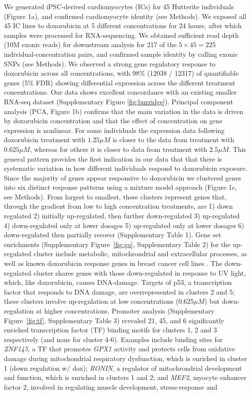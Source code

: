 \documentclass{article}
\begin{document}
We generated iPSC-derived cardiomyocytes (ICs) for 45 Hutterite individuals (Figure 1a), and confirmed cardiomyocyte identity (see Methods). We exposed all 45 IC lines to doxorubicin at 5 different concentrations for 24 hours, after which samples were processed for RNA-sequencing. We obtained sufficient read depth (10M exonic reads) for downstream analysis for 217 of the $5 \times 45 = 225$ individual-concentration pairs, and confirmed sample identity by calling exonic SNPs (see Methods). We observed a strong gene regulatory response to doxorubicin across all concentrations, with 98\% (12038 / 12317) of quantifiable genes (5\% FDR) showing differential expression across the different treatment concentrations. Our data shows excellent concordance with an existing smaller RNA-seq dataset\cite{Burridge2016} (Supplementary Figure \ref{fig:burridge}). Principal component analysis (PCA, Figure 1b) confirms that the main variation in the data is driven by doxorubicin concentration and that the effect of concentration on gene expression is nonlinear. For some individuals the expression data following doxorubicin treatment with $1.25\mu M$ is closer to the data from treatment with $0.625 \mu M$, whereas for others it is closer to data from treatment with $2.5\mu M$. This general pattern provides the first indication in our data that that there is systematic variation in how different individuals respond to doxorubicin exposure. Since the majority of genes appear responsive to doxorubicin we clustered genes into six distinct response patterns using a mixture model approach (Figure 1c, see Methods). From largest to smallest, these clusters represent genes that, through the gradient from low to high concentration treatments, are  1) down regulated 2) initially up-regulated, then further down-regulated 3) up-regulated 4) down-regulated only at lower dosages 5) up-regulated only at lower dosages 6) down-regulated then partially recover (Supplementary Table 1). Gene set enrichments (Supplementary Figure~\ref{fig:go}, Supplementary Table 2) for the up-regulated cluster include metabolic, mitochrondrial and extracellular processes, as well as known doxorubicin response genes in breast cancer cell lines \cite{graessmann2007chemotherapy}. The down-regulated cluster shares genes with those down-regulated in response to UV light, which, like doxorubicin, causes DNA-damage. Targets of p53, a transcription factor that responds to DNA damage, are overrepresented in clusters 2 and 5; these clusters involve up-regulation at low concentrations ($0.625\mu M$) but down-regulation at higher concentrations. Promoter analysis (Supplementary Figure~\ref{fig:tf}, Supplementary Table 3) revealed 21, 45, and 6 significantly enriched transcription factor (TF) binding motifs for clusters 1, 2 and 3 respectively (and none for cluster 4-6). Examples include binding sites for \emph{ZNF145}, a TF that promotes \emph{GPX1} activity and protects cells from oxidative damage during mitochondrial respiratory dysfunction\cite{Lu2012}, which is enriched in cluster 1 (down regulation w/ dox); \emph{RONIN}, a regulator of mitochrondrial development and function\cite{Poche2016}, which is enriched in clusters 1 and 2; and \emph{MEF2}, myocyte enhancer factor 2, involved in regulating muscle development, stress-response and 
\end{document}
